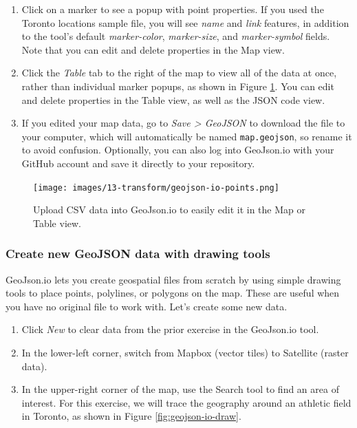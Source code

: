 \documentclass[
  english,
]{book}
\begin{document}
\begin{enumerate}
\def\labelenumi{\arabic{enumi}.}
\setcounter{enumi}{1}
\item
  Click on a marker to see a popup with point properties. If you used the Toronto locations sample file, you will see \emph{name} and \emph{link} features, in addition to the tool's default \emph{marker-color}, \emph{marker-size}, and \emph{marker-symbol} fields. Note that you can edit and delete properties in the Map view.
\item
  Click the \emph{Table} tab to the right of the map to view all of the data at once, rather than individual marker popups, as shown in Figure \ref{fig:geojson-io-points}. You can edit and delete properties in the Table view, as well as the JSON code view.
\item
  If you edited your map data, go to \emph{Save \textgreater{} GeoJSON} to download the file to your computer, which will automatically be named \texttt{map.geojson}, so rename it to avoid confusion. Optionally, you can also log into GeoJson.io with your GitHub account and save it directly to your repository.
\end{enumerate}



\begin{figure}
\centering
\texttt{[image: images/13-transform/geojson-io-points.png]}
\caption{\label{fig:geojson-io-points}Upload CSV data into GeoJson.io to easily edit it in the Map or Table view.}
\end{figure}

\hypertarget{create-new-geojson-data-with-drawing-tools}{%
\subsubsection*{Create new GeoJSON data with drawing tools}\label{create-new-geojson-data-with-drawing-tools}}

GeoJson.io lets you create geospatial files from scratch by using simple drawing
tools to place points, polylines, or polygons on the map.
These are useful when you have no original file to work with. Let's create some new data.

\begin{enumerate}
\def\labelenumi{\arabic{enumi}.}
\item
  Click \emph{New} to clear data from the prior exercise in the GeoJson.io tool.
\item
  In the lower-left corner, switch from Mapbox (vector tiles) to Satellite (raster data).
\item
  In the upper-right corner of the map, use the Search tool to find an area of interest.
  For this exercise, we will trace the geography around an athletic field in Toronto, as shown in
  Figure \ref{fig:geojson-io-draw}.
\end{enumerate}
\end{document}
